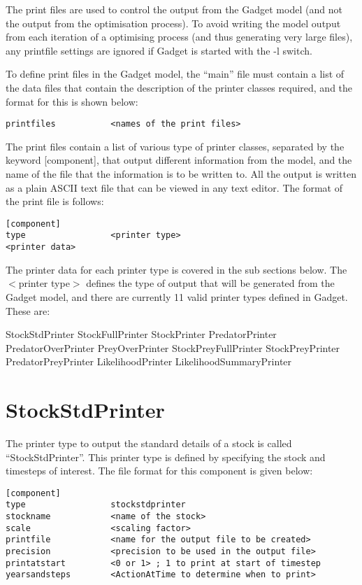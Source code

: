 \documentclass[]{book}
\begin{document}
The print files are used to control the output from the Gadget model
(and not the output from the optimisation process). To avoid writing the
model output from each iteration of a optimising process (and thus
generating very large files), any printfile settings are ignored if
Gadget is started with the -l switch.

To define print files in the Gadget model, the ``main'' file must contain
a list of the data files that contain the description of the printer
classes required, and the format for this is shown below:

\begin{verbatim}
printfiles           <names of the print files>
\end{verbatim}

The print files contain a list of various type of printer classes,
separated by the keyword {[}component{]}, that output different
information from the model, and the name of the file that the
information is to be written to. All the output is written as a plain
ASCII text file that can be viewed in any text editor. The format of the
print file is follows:

\begin{verbatim}
[component]
type                 <printer type>
<printer data>
\end{verbatim}

The printer data for each printer type is covered in the sub sections
below. The \(<\)printer type\(>\) defines the type of output that will be
generated from the Gadget model, and there are currently 11 valid
printer types defined in Gadget. These are:

StockStdPrinter StockFullPrinter StockPrinter PredatorPrinter
PredatorOverPrinter PreyOverPrinter StockPreyFullPrinter
StockPreyPrinter PredatorPreyPrinter LikelihoodPrinter
LikelihoodSummaryPrinter

\hypertarget{sec:stockstdprinter}{%
\section{StockStdPrinter}\label{sec:stockstdprinter}}

The printer type to output the standard details of a stock is called
``StockStdPrinter''. This printer type is defined by specifying the stock
and timesteps of interest. The file format for this component is given
below:

\begin{verbatim}
[component]
type                 stockstdprinter
stockname            <name of the stock>
scale                <scaling factor>
printfile            <name for the output file to be created>
precision            <precision to be used in the output file>
printatstart         <0 or 1> ; 1 to print at start of timestep
yearsandsteps        <ActionAtTime to determine when to print>
\end{verbatim}
\end{document}
